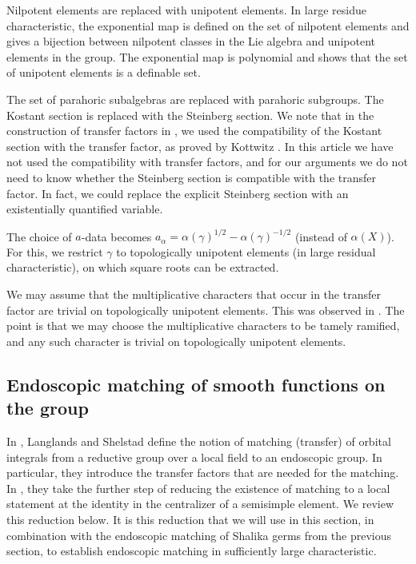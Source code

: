 \documentclass[12pt]{amsart}
\theoremstyle{plain}
\theoremstyle{definition}
\begin{document}
Nilpotent elements are replaced with unipotent elements.  In large
residue characteristic,
the exponential map is defined on the set of nilpotent elements and
gives a bijection between nilpotent classes in the Lie algebra and
unipotent elements in the group.  The exponential map is polynomial
and shows that the set of unipotent elements is a definable set.

The set of parahoric subalgebras are replaced with parahoric
subgroups.  The Kostant section is replaced with the Steinberg
section.  We note that in the construction of transfer factors in
\cite{CHL}, we used the compatibility of the Kostant section with the
transfer factor, as proved by Kottwitz \cite{Kott}.  In this article
we have not used the compatibility with transfer factors, and for our
arguments we do not need to know whether the Steinberg section is
compatible with the transfer factor.  In fact, we could replace the
explicit Steinberg section with an existentially quantified variable.

The choice of $a$-data becomes $a_\alpha = \alpha(\gamma)^{1/2} -
\alpha(\gamma)^{-1/2}$ (instead of $\alpha(X)$).  For this, we
restrict $\gamma$ to topologically unipotent elements (in large
residual characteristic), on which square roots can be extracted.

We may assume that the multiplicative characters that occur in the
transfer factor are trivial on topologically unipotent elements.  This
was observed in \cite{hales1993simple}.  The point is that we may
choose the multiplicative characters to be tamely ramified, and any
such character is trivial on topologically unipotent elements.

\subsection{Endoscopic matching of smooth functions on the group}

In \cite{LSxf}, Langlands and Shelstad define the notion of matching
(transfer) of orbital integrals from a reductive group over a local
field to an endoscopic group.  In particular, they introduce the
transfer factors that are needed for the matching.  In \cite{LSd},
they take the further step of reducing the existence of matching to
a local statement at the identity in the centralizer of a semisimple
element.  We review this reduction below.  It is this reduction that
we will use in this section, in combination with the endoscopic
matching of Shalika germs from the previous section, to establish
endoscopic matching in sufficiently large characteristic.
\end{document}
